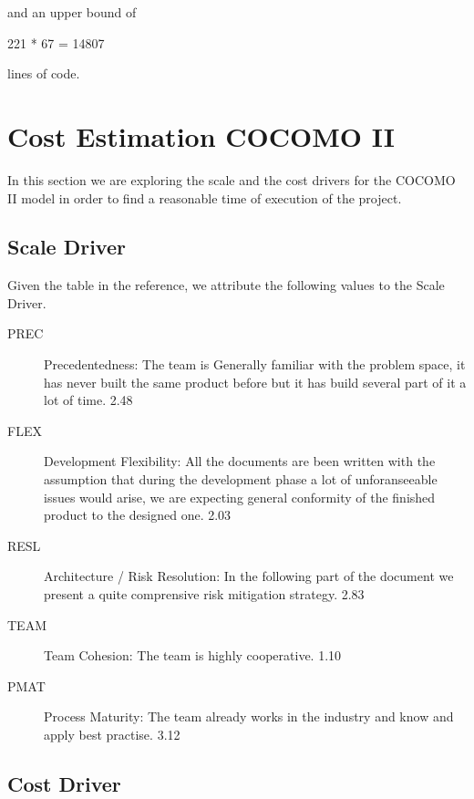 \documentclass[11pt]{article} %
\begin{document}
and an upper bound of

221 * 67 = 14807

lines of code.

\section{Cost Estimation COCOMO II}

In this section we are exploring the scale and the cost drivers for the COCOMO II model in order to find a reasonable time of execution of the project.

\subsection{Scale Driver}

Given the table in the reference, we attribute the following values to the Scale Driver.

\begin{description}
	\item[PREC] Precedentedness: The team is Generally familiar with the problem space, it has never built the same product before but it has build several part of it a lot of time. 2.48
	\item[FLEX] Development Flexibility: All the documents are been written with the assumption that during the development phase a lot of unforanseeable issues would arise, we are expecting general conformity of the finished product to the designed one. 2.03
	\item[RESL] Architecture / Risk Resolution: In the following part of the document we present a quite comprensive risk mitigation strategy. 2.83
	\item[TEAM] Team Cohesion: The team is highly cooperative. 1.10
	\item[PMAT] Process Maturity: The team already works in the industry and know and apply best practise. 3.12
\end{description}

\subsection{Cost Driver}
\end{document}
